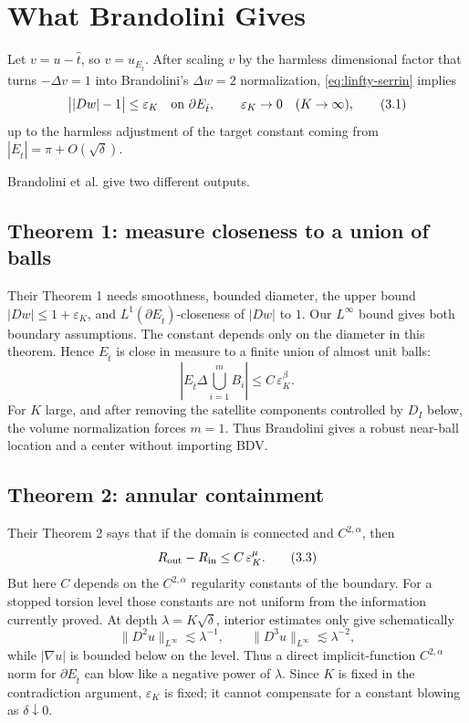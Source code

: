 \documentclass[11pt]{article}
\newcommand{\Et}{E_{\hat t}}
\newcommand{\eps}{\varepsilon}
\begin{document}
\section{What Brandolini Gives}

Let \(v=u-\hat t\), so \(v=u_{\Et}\).  After scaling \(v\) by the harmless
dimensional factor that turns \(-\Delta v=1\) into Brandolini's
\(\Delta w=2\) normalization, \eqref{eq:linfty-serrin} implies
\[
   \bigl||Dw|-1\bigr|\le \eps_K
   \quad\hbox{on }\partial\Et,
   \qquad
   \eps_K\to0\quad(K\to\infty),
   \tag{3.1}\label{eq:B-hyp}
\]
up to the harmless adjustment of the target constant coming from
\(|\Et|=\pi+O(\sqrt\delta)\).

Brandolini et al. give two different outputs.

\subsection{Theorem 1: measure closeness to a union of balls}

Their Theorem 1 needs smoothness, bounded diameter, the upper bound
\(|Dw|\le1+\eps_K\), and \(L^1(\partial\Et)\)-closeness of \(|Dw|\) to \(1\).
Our \(L^\infty\) bound gives both boundary assumptions.  The constant depends
only on the diameter in this theorem.  Hence \(\Et\) is close in measure to a
finite union of almost unit balls:
\[
   \left|\Et\Delta\bigcup_{i=1}^m B_i\right|
      \le C\,\eps_K^\beta.
   \tag{3.2}\label{eq:B-measure}
\]
For \(K\) large, and after removing the satellite components controlled by
\(D_I\) below, the volume normalization forces \(m=1\).  Thus Brandolini gives
a robust near-ball location and a center without importing BDV.

\subsection{Theorem 2: annular containment}

Their Theorem 2 says that if the domain is connected and \(C^{2,\alpha}\),
then
\[
   R_{\rm out}-R_{\rm in}\le C\,\eps_K^\mu.
   \tag{3.3}\label{eq:B-annulus}
\]
But here \(C\) depends on the \(C^{2,\alpha}\) regularity constants of the
boundary.  For a stopped torsion level those constants are not uniform from
the information currently proved.  At depth \(\lambda=K\sqrt\delta\), interior
estimates only give schematically
\[
   \|D^2u\|_{L^\infty}\lesssim \lambda^{-1},\qquad
   \|D^3u\|_{L^\infty}\lesssim \lambda^{-2},
   \tag{3.4}
\]
while \(|\nabla u|\) is bounded below on the level.  Thus a direct
implicit-function \(C^{2,\alpha}\) norm for \(\partial\Et\) can blow like a
negative power of \(\lambda\).  Since \(K\) is fixed in the contradiction
argument, \(\eps_K\) is fixed; it cannot compensate for a constant blowing as
\(\delta\downarrow0\).
\end{document}
